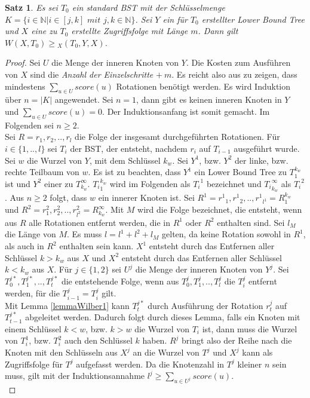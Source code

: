 \documentclass[a4paper,12pt]{article}
\newtheorem{Satz}{Satz}[section]
\begin{document}
\begin{Satz} \label{satzWilber1} Es sei $T_0$ ein standard BST mit der Schlüsselmenge\\ ${K = \{  i \in \mathbb{N} \vert i \in \left[j,k\right] \textit{ mit } j,k \in  \mathbb{N} \}} $. Sei $Y$ ein für $T_0$ erstellter Lower Bound Tree und $X$ eine zu $T_0$ erstellte Zugriffsfolge mit Länge $m$. Dann gilt\\  $W\left(X, T_0\right) \geq {_X(T_0, Y, X)} $.  
\end{Satz}
\begin{proof}
	Sei $U$ die Menge der inneren Knoten von $Y$. Die Kosten zum Ausführen von $X$ sind die \textit{Anzahl der Einzelschritte} $ +~m$. Es reicht also aus zu zeigen, dass mindestens $\sum_{u \in U} {\mathit{score}} \left(u\right)$ Rotationen benötigt werden. Es wird Induktion über  $n = \vert K \vert$ angewendet. Sei $n = 1$, dann gibt es keinen inneren Knoten in $Y$ und $\sum_{u \in U} {\mathit{score}} \left(u\right) = 0$. Der Induktionsanfang ist somit gemacht. Im Folgenden sei $n \geq 2$.\\
	Sei $R = r_1,r_2,..,r_l$ die Folge der insgesamt durchgeführten Rotationen. Für $i \in \{1,..,l\}$ sei $T_i$ der BST, der entsteht, nachdem $r_i$ auf $T_{i-1}$ ausgeführt wurde. Sei $w$ die Wurzel von $Y$, mit dem Schlüssel $k_w$. Sei $Y^1$, bzw. $Y^2$ der linke, bzw. rechte Teilbaum von $w$. Es ist zu beachten, dass $Y^1$ ein Lower Bound Tree zu $T_{1}^{k_w}$ ist und  $Y^2$ einer zu $T^\infty_{k_w}$. ${T_{i}}_1^{k_w}$ wird im Folgenden als ${T_i}^1$ bezeichnet und ${T_{i}}_{k_w}^{\infty}$ als ${T_i}^2$. Aus $n \geq 2$ folgt, dass $w$ ein innerer Knoten ist. Sei  $R^1 = {r^1}_1,{r^1}_2,..,{r^1}_{l^1} = R^{k_w}_1$ und $R^2 = r^2_1,r^2_2,..,r^2_{l^2} = R^\infty_{k_w}$. Mit $M$ wird die Folge bezeichnet, die entsteht, wenn aus $R$ alle Rotationen entfernt werden, die in $R^1$ oder $R^2$ enthalten sind. Sei $l_M$ die Länge von $M$. Es muss $l = l^1 + l^2 + l_M$ gelten, da keine Rotation sowohl in $R^1$, als auch in $R^2$ enthalten sein kann. $X^1$ entsteht durch das Entfernen aller Schlüssel $k > k_w$ aus $X$ und  $X^2$ entsteht durch das Entfernen aller Schlüssel $k < k_w$ aus $X$. Für $j \in \{1,2\}$ sei $U^j$ die Menge der inneren Knoten von $Y^j$. Sei $T^{j*}_0,T^{j*}_1,..,T^{j*}_{t}$ die entstehende Folge, wenn aus $T^{j}_0,T^{j}_1,..,T^{j}_{l}$ die $T^j_i$ entfernt werden, für die $T^j_{i-1} = T^j_i$ gilt.\\ Mit Lemma \ref{lemmaWilber1} kann  $T^{j*}_{t}$ durch Ausführung der Rotation $r^j_t$ auf $T^{j*}_{t-1}$ abgeleitet werden. Dadurch folgt durch dieses Lemma, falls ein Knoten mit einem Schlüssel $k < w$, bzw. $k > w$ die Wurzel von $T_i$ ist, dann muss die Wurzel von $T^1_i$, bzw. $T^2_i$ auch den Schlüssel $k$ haben. $R^j$ bringt also der Reihe nach die Knoten mit den Schlüsseln aus $X^j$ an die Wurzel von $T^j$ und  $X^j$ kann als Zugriffsfolge für $T^j$ aufgefasst werden. Da die Knotenzahl in $T^j$ kleiner $n$ sein muss, gilt mit der Induktionsannahme  $l^j \geq \sum_{u \in U^j} {\mathit{score}} (u)$.\\

\end{proof}
\end{document}
